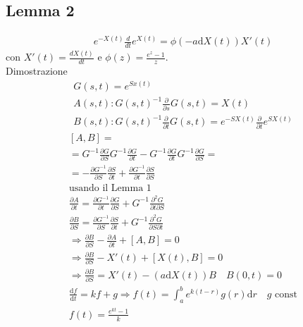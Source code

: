 \subsection{Lemma 2} %
\begin{equation}\begin{split}
e^{-X\left(t\right)}\frac{d}{dt}e^{X\left(t\right)}=\phi\left(-a\textrm{d}X\left(t\right)\right)X'\left(t\right)
\end{split}\end{equation}
con $X'\left(t\right)=\frac{dX\left(t\right)}{dt}$ e $\phi\left(z\right)=\frac{e^z-1}{z}$. \\
Dimostrazione
\begin{equation}\begin{split}
G\left(s,t\right)=e^{Sx\left(t\right)} \\
A\left(s,t\right):G\left(s,t\right)^{-1}\frac{\partial }{\partial s}G\left(s,t\right)=X\left(t\right) \\
B\left(s,t\right):G\left(s,t\right)^{-1}\frac{\partial }{\partial t}G\left(s,t\right)=e^{-SX\left(t\right)}\frac{\partial }{\partial t}e^{SX\left(t\right)}
\end{split}\end{equation}
\begin{equation}\begin{split}
\left[A,B\right]=\\
=G^{-1}\frac{\partial G}{\partial S}G^{-1}\frac{\partial G}{\partial t}-G^{-1}\frac{\partial G}{\partial t}G^{-1}\frac{\partial G}{\partial S}= \\
=-\frac{\partial G^{-1}}{\partial S}\frac{\partial S}{\partial t}+\frac{\partial G^{-1}}{\partial t}\frac{\partial S}{\partial S} \\
\textrm{usando il Lemma 1} \\
\frac{\partial A}{\partial t}=\frac{\partial G^{-1}}{\partial t}\frac{\partial G}{\partial S}+G^{-1}\frac{\partial ^2G}{\partial t\partial S} \\
\frac{\partial B}{\partial S}=\frac{\partial G^{-1}}{\partial S}\frac{\partial S}{\partial t}+G^{-1}\frac{\partial ^2G}{\partial S\partial t} \\
\Longrightarrow \frac{\partial B}{\partial S}-\frac{\partial A}{\partial t}+\left[A,B\right]=0 \\
\Longrightarrow \frac{\partial B}{\partial S}-X'\left(t\right)+\left[X\left(t\right),B\right]=0 \\
\Longrightarrow \frac{\partial B}{\partial S}=X'\left(t\right)-\left(a\textrm{d}X\left(t\right)\right)B \quad B\left(0,t\right)=0\\
\frac{\textrm{d}f}{\textrm{d}t}=kf+g \Longrightarrow f\left(t\right)=\int_{a}^{b}{e^{k\left(t-r\right)}g\left(r\right)\textrm{d}r} \quad g\textrm{ const} \\
f\left(t\right)=\frac{e^{kt}-1}{k}
\end{split}\end{equation}

